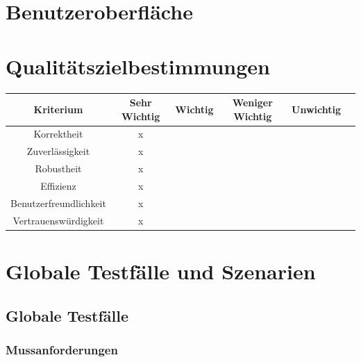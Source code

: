 \documentclass[a4paper,12pt]{article}
\begin{document}
\section{Benutzeroberfläche}
\section{Qualitätszielbestimmungen}
\begin{tabular}[t]{|c|c|c|c|c|c|}
  \hline
  \textbf{Kriterium} & \textbf{Sehr Wichtig} & \textbf{Wichtig} & \textbf{Weniger Wichtig} & \textbf{Unwichtig}\\
  \hline
  \hline
  Korrektheit & x & & &\\
  \hline
  Zuverlässigkeit & x & & &\\
  \hline
  Robustheit & x & & &\\
  \hline
  Effizienz & x & & &\\
  \hline
  Benutzerfreundlichkeit & x & & &\\
  \hline
  Vertrauenswürdigkeit & x & & &\\
  \hline

\end{tabular}

\section{Globale Testfälle und Szenarien}
  \subsection{Globale Testfälle}
  \subsubsection{Mussanforderungen}
\end{document}
